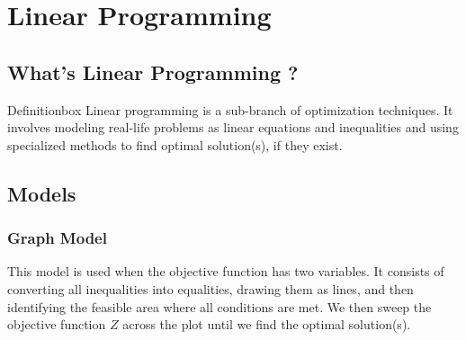 \section{Linear Programming}
\subsection{What's Linear Programming ?}
\begin{prettyBox}{Definition}{box} 
Linear programming is a sub-branch of optimization techniques. It involves modeling real-life problems as
linear equations and inequalities and using specialized methods to find optimal solution(s), if they exist.
\end{prettyBox}
\vspace{0.25cm}
\begin{center}
\end{center}
\vspace{1cm}
\subsection{Models}
\subsubsection{Graph Model}
This model is used when the objective function has two variables. It consists of converting all inequalities
into equalities, drawing them as lines, and then identifying the feasible area where all conditions are met.
We then sweep the objective function \(Z\) across the plot until we find the optimal solution(s).

